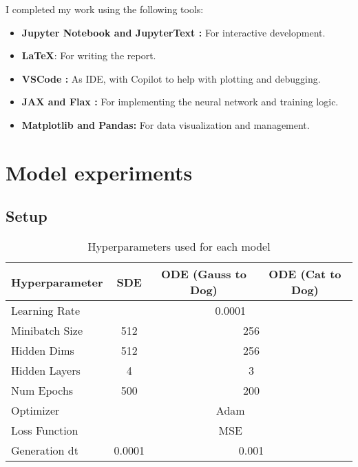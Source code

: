 \documentclass[conference,a4paper]{IEEEtran}
\begin{document}
I completed my work using the following tools:
\begin{itemize}
    \item \textbf{Jupyter Notebook \cite{Kluyver2016jupyter} and JupyterText \cite{woutsMwoutsJupytext2025}:} For interactive development.
    \item \textbf{\LaTeX}: For writing the report.
    \item \textbf{VSCode \cite{MicrosoftVscode2025}:} As IDE, with Copilot to help with plotting and debugging.
    \item \textbf{JAX \cite{jax2018github} and Flax \cite{flax2020github}:} For implementing the neural network and training logic.
    \item \textbf{Matplotlib\cite{Hunter:2007} and Pandas\cite{thepandasdevelopmentteamPandasdevPandasPandas}:} For data visualization and management.
\end{itemize}





\appendix

\section{Model experiments}


\subsection{Setup}
\begin{table}
    \caption{Hyperparameters used for each model}
    \label{tab:hyp}
    \centering
    \begin{tabular}{lccc}
        \toprule
        Hyperparameter & SDE & ODE (Gauss to Dog) & ODE (Cat to Dog) \\
        \midrule
        Learning Rate & \multicolumn{3}{c}{0.0001} \\
        Minibatch Size & 512 & \multicolumn{2}{c}{256} \\
        Hidden Dims & 512 & \multicolumn{2}{c}{256}\\
        Hidden Layers & 4 & \multicolumn{2}{c}{3} \\
        Num Epochs & 500 & \multicolumn{2}{c}{200}\\
        Optimizer & \multicolumn{3}{c}{Adam} \\
        Loss Function & \multicolumn{3}{c}{MSE} \\
        Generation dt & 0.0001 & \multicolumn{2}{c}{0.001} \\
        \midrule
        \bottomrule
    \end{tabular}
\end{table}
\end{document}
